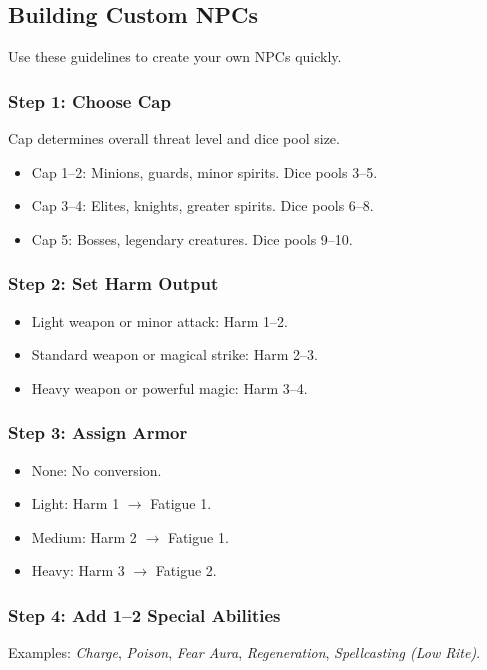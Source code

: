 \subsection{Building Custom NPCs}

Use these guidelines to create your own NPCs quickly.

\subsubsection{Step 1: Choose Cap}
Cap determines overall threat level and dice pool size.
\begin{itemize}
  \item Cap 1--2: Minions, guards, minor spirits. Dice pools 3--5.
  \item Cap 3--4: Elites, knights, greater spirits. Dice pools 6--8.
  \item Cap 5: Bosses, legendary creatures. Dice pools 9--10.
\end{itemize}

\subsubsection{Step 2: Set Harm Output}
\begin{itemize}
  \item Light weapon or minor attack: Harm 1--2.
  \item Standard weapon or magical strike: Harm 2--3.
  \item Heavy weapon or powerful magic: Harm 3--4.
\end{itemize}

\subsubsection{Step 3: Assign Armor}
\begin{itemize}
  \item None: No conversion.
  \item Light: Harm 1 $\rightarrow$ Fatigue 1.
  \item Medium: Harm 2 $\rightarrow$ Fatigue 1.
  \item Heavy: Harm 3 $\rightarrow$ Fatigue 2.
\end{itemize}

\subsubsection{Step 4: Add 1--2 Special Abilities}
Examples: \textit{Charge}, \textit{Poison}, \textit{Fear Aura}, \textit{Regeneration}, \textit{Spellcasting (Low Rite)}.

